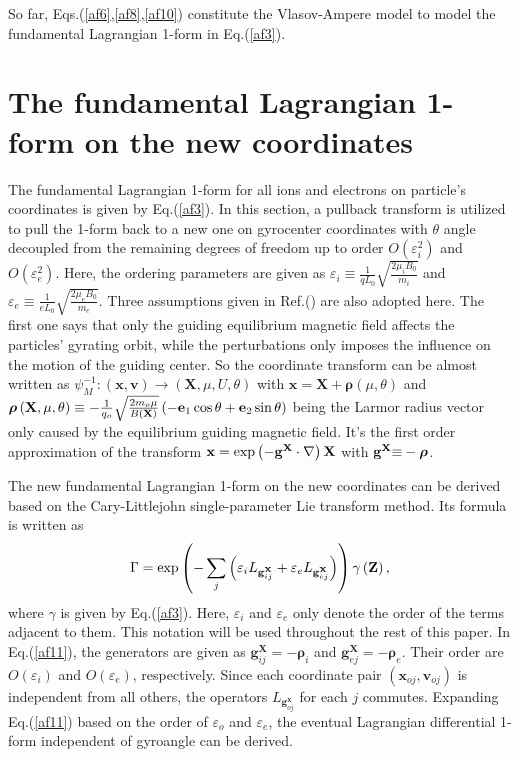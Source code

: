 \documentclass[12pt]{iopart}
\begin{document}
So far, Eqs.(\ref{af6},\ref{af8},\ref{af10}) constitute the Vlasov-Ampere model to model the fundamental Lagrangian 1-form in Eq.(\ref{af3}).

\section{The fundamental Lagrangian 1-form on the new coordinates}\label{sec3}

The fundamental Lagrangian 1-form for all ions and electrons on particle's coordinates is given by Eq.(\ref{af3}). In this section, a pullback transform is utilized to pull the 1-form back to a new one on gyrocenter coordinates with $\theta$ angle decoupled from the remaining degrees of freedom up to order $O(\varepsilon_i^2)$ and $O(\varepsilon_e^{2})$. Here, the ordering parameters are given as ${\varepsilon _i} \equiv \frac{1}{{q{L_0}}}\sqrt {\frac{{2{\mu _{i }}{B_0}}}{{{m_i}}}}$ and ${\varepsilon _e} \equiv \frac{1}{{e{L_0}}}\sqrt {\frac{{2{\mu _{e}}{B_0}}}{{{m_e}}}} $. Three assumptions given in Ref.(\cite{2017shuangxi}) are also adopted here. The first one says that only the guiding equilibrium magnetic field affects the particles' gyrating orbit, while the perturbations only imposes the influence on the motion of the guiding center. So the coordinate transform can be almost written as $\psi_M^{-1}: (\mathbf{x},\mathbf{v})\to (\mathbf{X},\mu,U,\theta)$ with $\mathbf{x}=\mathbf{X}+\bm{\rho}(\mu,\theta)$ and $\bm{\rho} \left( {\mathbf{X},\mu ,\theta } \right) \equiv  - \frac{1}{{{q_o}}}\sqrt {\frac{{2{m_o}{\mu }}}{{B\left( {\bf{X}} \right)}}} \left( { - {{\bf{e}}_1}\cos \theta  + {{\bf{e}}_2}\sin \theta } \right)$ being the Larmor radius vector only caused by the equilibrium guiding magnetic field. It's the first order approximation of the transform ${\bf{x}} = \exp \left( { - {{\bf{g}}^{\bf{X}}}\cdot\nabla } \right){\bf{X}}$ with ${{\bf{g}}^{\bf{X}}}{\rm{ \equiv }}-\bm{\rho}$.

The new fundamental Lagrangian 1-form on the new coordinates can be derived based on the Cary-Littlejohn single-parameter Lie transform method. Its formula is written as
\begin{equation}\label{af11}
\Gamma  = \exp \left( { - \sum\limits_j {\left( {{\varepsilon _i}{L_{{\bf{g}}_{ij}^{\bf{X}}}} + {\varepsilon _e}{L_{{\bf{g}}_{ej}^{\bf{X}}}}} \right)} } \right)\gamma \left( {\bf{Z}} \right),
\end{equation}
where $\gamma$ is given by Eq.(\ref{af3}). Here, $\varepsilon_i$ and $\varepsilon_e$ only denote the order of the terms adjacent to them. This notation will be used throughout the rest of this paper. In Eq.(\ref{af11}), the generators are given as $\mathbf{g}_{ij}^{\mathbf{X}}=-\bm{\rho}_i$ and $\mathbf{g}_{ej}^{\mathbf{X}}=-\bm{\rho}_e$. Their order are $O(\varepsilon_i)$ and $O(\varepsilon_e)$, respectively. Since each coordinate pair $(\mathbf{x}_{oj},\mathbf{v}_{oj})$ is independent from all others, the operators $L_{\mathbf{g}_{oj}^\mathbf{x}}$ for each $j$ commutes. Expanding Eq.(\ref{af11}) based on the order of $\varepsilon_o$ and $\varepsilon_e$, the eventual Lagrangian differential 1-form independent of gyroangle can be derived.
\end{document}

